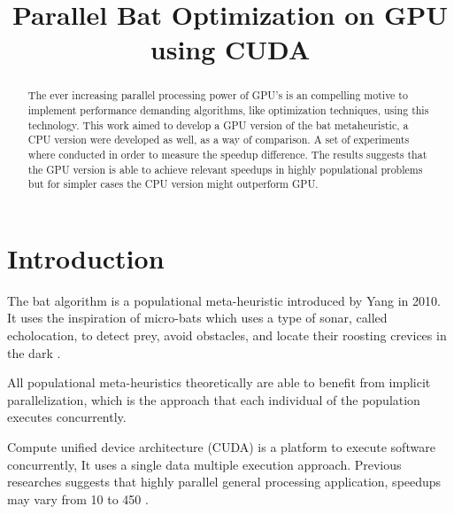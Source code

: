 \documentclass[conference]{IEEEtran}
\begin{document}
\title{Parallel Bat Optimization on GPU using CUDA}

\author{
\and
{}
}

\maketitle
\begin{abstract}
The ever increasing parallel processing power of GPU's is an compelling
motive to implement performance demanding algorithms, like optimization
techniques, using this technology. This work aimed to develop a GPU
version of the bat metaheuristic, a CPU version were developed as well,
as a way of comparison. A set of experiments where conducted in order
to measure the speedup difference. The results suggests that the GPU
version is able to achieve relevant speedups in highly populational
problems but for simpler cases the CPU version might outperform GPU.
\end{abstract}
\IEEEpeerreviewmaketitle

\section{Introduction}

The bat algorithm is a populational meta-heuristic introduced by Yang in
2010. It uses the inspiration of micro-bats which uses a type of sonar,
called echolocation, to detect prey, avoid obstacles, and locate their
roosting crevices in the dark \cite{original}.

All populational meta-heuristics theoretically are able to benefit from
implicit parallelization, which is the approach that each individual of
the population executes concurrently.

Compute unified device architecture (CUDA) is a platform to execute
software concurrently, It uses a single data multiple execution
approach. Previous researches suggests that highly parallel
general processing application, speedups may vary from 10 to 450
\cite{cuda_optimizations}.
\end{document}

